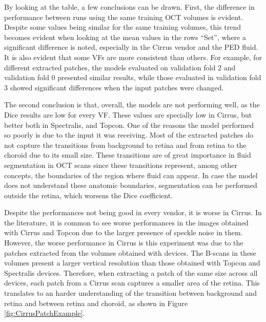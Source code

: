 By looking at the table, a few conclusions can be drawn. First, the difference in performance between runs using the same training OCT volumes is evident. Despite some values being similar for the same training volumes, this trend becomes evident when looking at the mean values in the rows ``Set'', where a significant difference is noted, especially in the Cirrus vendor and the PED fluid. It is also evident that some VFs are more consistent than others. For example, for different extracted patches, the models evaluated on validation fold 2 and validation fold 0 presented similar results, while those evaluated in validation fold 3 showed significant differences when the input patches were changed.
\par
The second conclusion is that, overall, the models are not performing well, as the Dice results are low for every VF. These values are specially low in Cirrus, but better both in Spectralis, and Topcon. One of the reasons the model performed so poorly is due to the input it was receiving. Most of the extracted patches do not capture the transitions from background to retina and from retina to the choroid due to its small size. These transitions are of great importance in fluid segmentation in OCT scans since these transitions represent, among other concepts, the boundaries of the region where fluid can appear. In case the model does not understand these anatomic boundaries, segmentation can be performed outside the retina, which worsens the Dice coefficient.
\par
Despite the performances not being good in every vendor, it is worse in Cirrus. In the literature, it is common to see worse performances in the images obtained with Cirrus and Topcon due to the larger presence of speckle noise in them. However, the worse performance in Cirrus is this experiment was due to the patches extracted from the volumes obtained with devices. The B-scans in these volumes present a larger vertical resolution than those obtained with Topcon and Spectralis devices. Therefore, when extracting a patch of the same size across all devices, each patch from a Cirrus scan captures a smaller area of the retina. This translates to an harder understanding of the transition between background and retina and between retina and choroid, as shown in Figure \ref{fig:CirrusPatchExample}.

